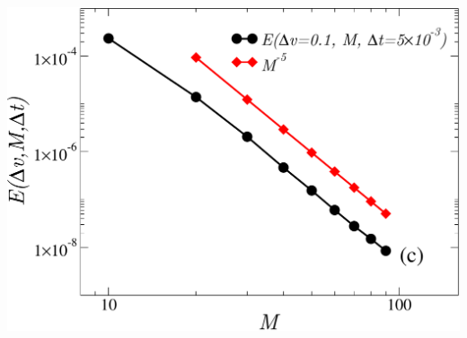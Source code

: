 \begin{frame}
\begin{columns}
\begin{column}{0.33\textwidth}
  \includegraphics[width=1.1\textwidth]{figuras/xiconv.pdf}
\end{column}
\end{columns}

\end{frame}






